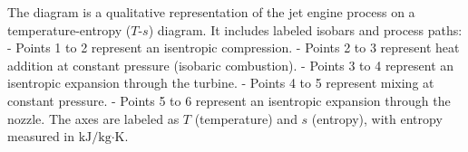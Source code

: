 The diagram is a qualitative representation of the jet engine process on a temperature-entropy (\( T \)-\( s \)) diagram. It includes labeled isobars and process paths:  
- Points 1 to 2 represent an isentropic compression.  
- Points 2 to 3 represent heat addition at constant pressure (isobaric combustion).  
- Points 3 to 4 represent an isentropic expansion through the turbine.  
- Points 4 to 5 represent mixing at constant pressure.  
- Points 5 to 6 represent an isentropic expansion through the nozzle.  
The axes are labeled as \( T \) (temperature) and \( s \) (entropy), with entropy measured in \( \text{kJ/kg·K} \).